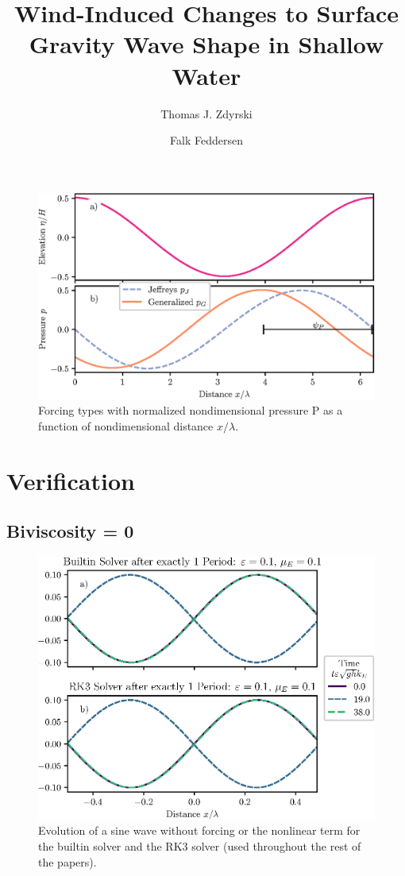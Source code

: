 \documentclass{jfm}
\title{Wind-Induced Changes to Surface Gravity Wave Shape in Shallow Water}
\author{Thomas J. Zdyrski \and Falk Feddersen}
\let\Oldsection\section
\renewcommand{\section}{\FloatBarrier\Oldsection}
\let\Oldsubsection\subsection
\renewcommand{\subsection}{\FloatBarrier\Oldsubsection}
\begin{document}
\begin{figure}
  \centering
  \includegraphics{Forcing-Types.eps}
  \caption{
    Forcing types with normalized nondimensional pressure P as a
    function of nondimensional distance $x/\lambda$.
  }
\end{figure}

\section{Verification}
\subsection{Biviscosity = \num{0}}
\begin{figure}
  \centering
  \includegraphics{TrigVerf-no-NuBi.eps}
  \caption{
    Evolution of a sine wave without forcing or the nonlinear term for
    the builtin solver and the RK3 solver (used throughout the rest of
    the papers).
  }
\end{figure}
\end{document}
